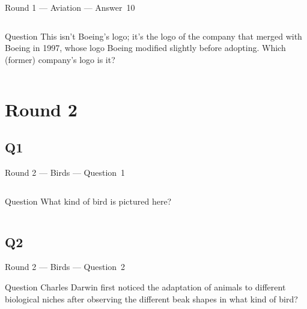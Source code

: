 \documentclass[11pt]{beamer}
\begin{document}
\begin{frame}[t]{Round 1 --- Aviation --- \mbox{Answer 10}}
\vspace{-0.5em}
\begin{columns}[T,totalwidth=\linewidth]
\begin{column}{0.32\linewidth}
\begin{block}{Question}
This isn't Boeing's logo; it's the logo of the company that merged with Boeing in 1997, whose logo Boeing modified slightly before adopting. Which (former) company's logo is it?
\end{block}
\end{column}
\begin{column}{0.65\linewidth}
\begin{center}
\texttt{[image: \{Images/mcdonnelldouglas]}.png}
\end{center}
\end{column}
\end{columns}
\end{frame}
\def\thisSectionName{Birds}
\section{Round 2}
\subsection*{Q1}
\begin{frame}[t]{Round 2 --- Birds --- \mbox{Question 1}}
\vspace{-0.5em}
\begin{columns}[T,totalwidth=\linewidth]
\begin{column}{0.32\linewidth}
\begin{block}{Question}
What kind of bird is pictured here?
\end{block}
\end{column}
\begin{column}{0.65\linewidth}
\begin{center}
\texttt{[image: \{Images/starling]}.jpg}
\end{center}
\end{column}
\end{columns}
\end{frame}
\subsection*{Q2}
\begin{frame}[t]{Round 2 --- Birds --- \mbox{Question 2}}
\vspace{-0.5em}
\begin{block}{Question}
Charles Darwin first noticed the adaptation of animals to different biological niches after observing the different beak shapes in what kind of bird?
\end{block}
\end{frame}
\end{document}

